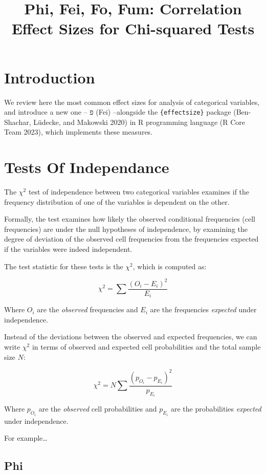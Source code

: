 \documentclass[
]{article}
\title{Phi, Fei, Fo, Fum: Correlation Effect Sizes for Chi-squared
Tests}
\author{}
\date{\vspace{-2.5em}}
\begin{document}
\maketitle

\hypertarget{introduction}{%
\section{Introduction}\label{introduction}}

We review here the most common effect sizes for analysis of categorical
variables, and introduce a new one -- \(פ\) (Fei) --alongside the
\texttt{\{effectsize\}} package (Ben-Shachar, Lüdecke, and Makowski
2020) in R programming language (R Core Team 2023), which implements
these measures.

\hypertarget{tests-of-independance}{%
\section{Tests Of Independance}\label{tests-of-independance}}

The \(\chi^2\) test of independence between two categorical variables
examines if the frequency distribution of one of the variables is
dependent on the other.

Formally, the test examines how likely the observed conditional
frequencies (cell frequencies) are under the null hypotheses of
independence, by examining the degree of deviation of the observed cell
frequencies from the frequencies expected if the variables were indeed
independent.

The test statistic for these tests is the \(\chi^2\), which is computed
as:

\[
\chi^2 = \sum{\frac{(O_i-E_i)^2}{E_i}}
\]

Where \(O_i\) are the \emph{observed} frequencies and \(E_i\) are the
frequencies \emph{expected} under independence.

Instead of the deviations between the observed and expected frequencies,
we can write \(\chi^2\) in terms of observed and expected cell
probabilities and the total sample size \(N\):

\[
\chi^2 = N\sum{\frac{(p_{O_i}-p_{E_i})^2}{p_{E_i}}}
\]

Where \(p_{O_i}\) are the \emph{observed} cell probabilities and
\(p_{E_i}\) are the probabilities \emph{expected} under independence.

For example\ldots{}

\hypertarget{phi}{%
\subsection{Phi}\label{phi}}
\end{document}
